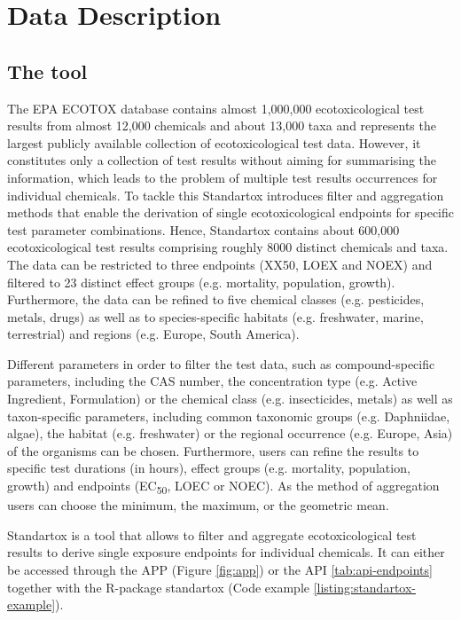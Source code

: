 \section{Data Description}

\subsection{The tool}
The EPA ECOTOX database contains almost 1,000,000 ecotoxicological test results from almost 12,000 chemicals and about 13,000 taxa \citep{usepa_ecotox_2019} and represents the largest publicly available collection of ecotoxicological test data. However, it constitutes only a collection of test results without aiming for summarising the information, which leads to the problem of multiple test results occurrences for individual chemicals. To tackle this Standartox introduces filter and aggregation methods that enable the derivation of single ecotoxicological endpoints for specific test parameter combinations. Hence, Standartox contains about 600,000 ecotoxicological test results comprising roughly 8000 distinct chemicals and taxa. The data can be restricted to three endpoints (XX50, LOEX and NOEX) and filtered to 23 distinct effect groups (e.g. mortality, population, growth). Furthermore, the data can be refined to five chemical classes (e.g. pesticides, metals, drugs) as well as to species-specific habitats (e.g. freshwater, marine, terrestrial) and regions (e.g. Europe, South America).


Different parameters in order to filter the test data, such as compound-specific parameters, including the CAS number, the concentration type (e.g. Active Ingredient, Formulation) or the chemical class (e.g. insecticides, metals) as well as taxon-specific parameters, including common taxonomic groups (e.g. Daphniidae, algae), the habitat (e.g. freshwater) or the regional occurrence (e.g. Europe, Asia) of the organisms can be chosen. Furthermore, users can refine the results to specific test durations (in hours), effect groups (e.g. mortality, population, growth) and endpoints (EC\textsubscript{50}, LOEC or NOEC). As the method of aggregation users can choose the minimum, the maximum, or the geometric mean.









Standartox is a tool that allows to filter and aggregate ecotoxicological test results to derive single exposure endpoints for individual chemicals. It can either be accessed through the APP (Figure \ref{fig:app}) or the API \ref{tab:api-endpoints} together with the R-package standartox (Code example \ref{listing:standartox-example}). 





